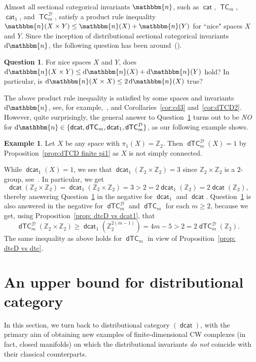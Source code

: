 \documentclass[amscd,amssymb,verbatim,11pt]{amsart}
\theoremstyle{plain}
\theoremstyle{definition}
\newtheorem{ex}[thm]{Example}
\newtheorem{question}[thm]{Question}
\DeclareMathOperator{\cat}{{\mathsf{cat}}}
\DeclareMathOperator{\TC}{{\mathsf{TC}}}
\DeclareMathOperator{\dcat}{{\mathsf{dcat}}}
\DeclareMathOperator{\dTC}{{\mathsf{dTC}}}
\newcommand{\D}{\mathcal{D}}
\def\Z{{\mathbb Z}}
\begin{document}
Almost all sectional categorical invariants $\mathbbm{n}$, such as $\cat$, $\TC_m$, $\cat_1$, and $\TC_m^{\D}$, satisfy a product rule inequality $\mathbbm{n}(X\times Y)\le\mathbbm{n}(X)+\mathbbm{n}(Y)$ for ``nice" spaces $X$ and $Y$. Since the inception of distributional sectional categorical invariants $\text{d}\mathbbm{n}$, the following question has been around~(\cite[Question 3.4]{DJ}).

\begin{question}\label{ques: prod ineq}
    For nice spaces $X$ and $Y$, does $\text{d}\mathbbm{n}(X\times Y)\le\text{d}\mathbbm{n}(X)+\text{d}\mathbbm{n}(Y)$ hold? In particular, is $\text{d}\mathbbm{n}(X\times X)\le 2\hspace{0.5mm}\text{d}\mathbbm{n}(X)$ true?
\end{question}

The above product rule inequality is satisfied by some spaces and invariants $\text{d}\mathbbm{n}$, see, for example,~\cite{DJ,Ja1,JO}, and Corollaries~\ref{cor:cd3} and~\ref{cor:dTCD2}. However, quite surprisingly, the general answer to 
Question~\ref{ques: prod ineq} turns out to be \emph{NO} for 
$\text{d}\mathbbm{n}\in\{\dcat,\dTC_m,\dcat_1,\dTC^{\D}_m\}$, as our following example shows.

\begin{ex}\label{exam:pi1Z2}
Let $X$ be any space with $\pi_1(X)=\Z_2$. Then  $\dTC_m^{\D}(X) = 1$ by Proposition~\ref{prop:dTCD finite pi1} as $X$ is not simply connected. 

While $\dcat_1(X)=1$, we see that $\dcat_1(\Z_2\times \Z_2) = 3$ since $\Z_2 \times \Z_2$ is a $2$-group, see~\cite[Theorem 1.1(2)]{KW2}. In particular, we get
\[
\dcat(\Z_2\times\Z_2)=\dcat_1(\Z_2\times\Z_2)=3 > 2=2\dcat_1(\Z_2)=2\dcat(\Z_2), 
\]
thereby answering Question~\ref{ques: prod ineq} in the negative for $\dcat_1$ 
and $\dcat$.   Question~\ref{ques: prod ineq} is also answered in the 
negative for $\dTC_m^{\D}$ and $\dTC_m$ for each $m\ge 2$, because we get, using Proposition~\ref{prop: dtcD vs dcat1}, that
\[
\dTC_m^{\D}(\Z_2\times\Z_2) \ge \dcat_1(\Z_2^{2(m-1)}) =4m-5 > 2=2\dTC_m^{\D}(\Z_2).
\]
The same inequality as above holds for $\dTC_m$ in view of Proposition~\ref{prop: dtcD vs dtc}.
\end{ex}


\section{An upper bound for distributional category}\label{sec:an inequality}
In this section, we turn back to distributional category $(\dcat)$, with the primary aim of obtaining new examples of finite-dimensional CW complexes (in fact, closed manifolds) on which the distributional invariants \emph{do not} coincide with their classical counterparts. 
\end{document}
